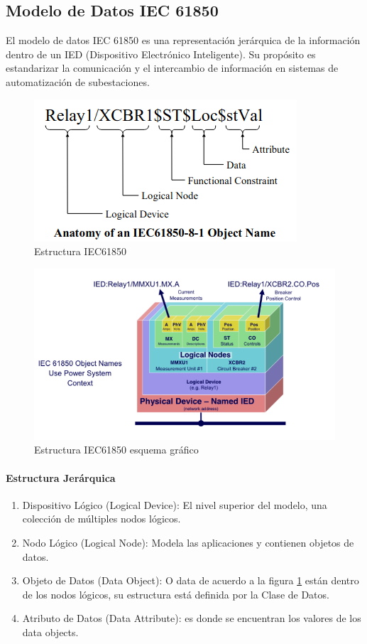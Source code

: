 \documentclass[a5paper]{book}%
\begin{document}
\subsection{Modelo de Datos IEC 61850}

El modelo de datos IEC 61850 es una representación jerárquica de la información dentro de un IED (Dispositivo Electrónico Inteligente). Su propósito es estandarizar la comunicación y el intercambio de información en sistemas de automatización de subestaciones.

\begin{figure}[H]
  \centering
  \caption{Estructura IEC61850}
  \label{fig:iec61850}
  \includegraphics[width=0.5\linewidth]{anatomia_iec}
\end{figure}

\begin{figure}[H]
  \centering
  \caption{Estructura IEC61850 esquema gráfico}
  \label{fig:iec61850_ln}
  \includegraphics[width=0.7\linewidth]{LNs}
\end{figure}

\paragraph{Estructura Jerárquica}

\begin{enumerate}
\item     Dispositivo Lógico (Logical Device): El nivel superior del modelo, una colección de múltiples nodos lógicos.
    
\item Nodo Lógico (Logical Node): Modela las  aplicaciones y contienen objetos de datos.
    
\item Objeto de Datos (Data Object): O data de acuerdo a la figura \ref{fig:iec61850} están dentro de los nodos lógicos, su estructura está definida por la Clase de Datos.
    
\item Atributo de Datos (Data Attribute): es donde se encuentran los valores de los data objects.
  \end{enumerate}
\end{document}
